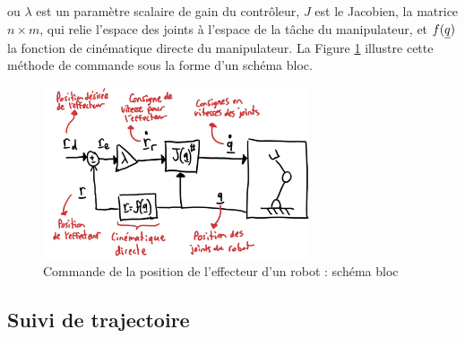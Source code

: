 ou $\lambda$ est un paramètre scalaire de gain du contrôleur, $J$ est le Jacobien, la matrice $n \times m$, qui relie l'espace des joints à l'espace de la tâche du manipulateur, et $f(\underline{q})$ la fonction de cinématique directe du manipulateur. La Figure \ref{fig:robotspeedcontrolpos} illustre cette méthode de commande sous la forme d'un schéma bloc. 
\begin{figure}[H]
	\centering
		\includegraphics[width=0.7\textwidth]{fig/robotspeedcontrolpos.jpg}
	\caption{Commande de la position de l'effecteur d'un robot : schéma bloc}
	\label{fig:robotspeedcontrolpos}
\end{figure}










\subsection{Suivi de trajectoire}
\label{sec:trajcontrol}

